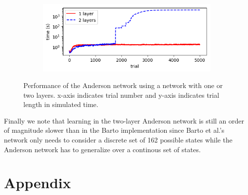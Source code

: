 \documentclass{article}
\begin{document}
\begin{figure}[h]
	\centering
	\begin{subfigure}[t]{0.60\linewidth}
		\centering
		\includegraphics[width = 1.0\linewidth, trim={0 0 0 0}, clip=true]{figures/compare_layers.png}	
	\end{subfigure}%
\caption{Performance of the Anderson network using a network with one or two layers. x-axis indicates trial number and y-axis indicates trial length in simulated time.}
\label{fig:cart_layers}
\end{figure}

Finally we note that learning in the two-layer Anderson network is still an order of magnitude slower than in the Barto implementation since Barto et al.'s network only needs to consider a discrete set of 162 possible states while the Anderson network has to generalize over a continous set of states.

\newpage

\section*{Appendix}










\end{document}
